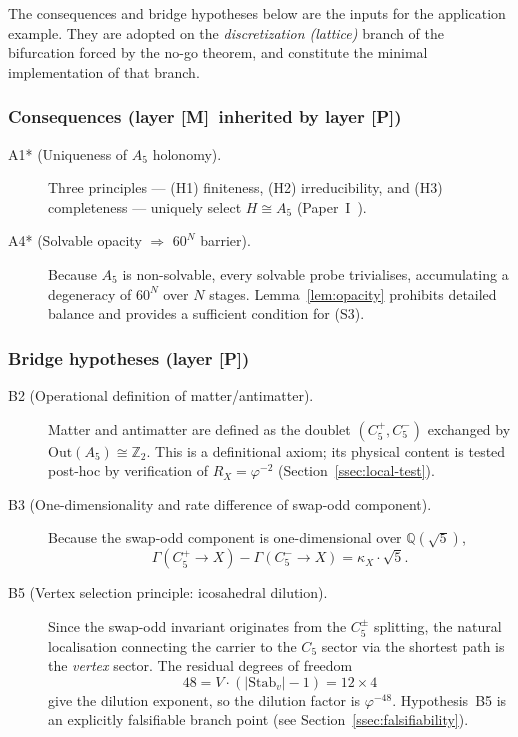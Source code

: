 \documentclass[sn-mathphys-num,Numbered]{sn-jnl}
\theoremstyle{thmstyleone}
\theoremstyle{thmstylethree}
\theoremstyle{thmstyletwo}
\newcommand{\Qsqrt}{\mathbb{Q}(\sqrt{5})}
\newcommand{\tagM}{[\textbf{M}]}
\newcommand{\tagP}{[\textbf{P}]}
\begin{document}
The consequences and bridge hypotheses below are the inputs for the
application example.  They are adopted on the \emph{discretization
(lattice)} branch of the bifurcation forced by the no-go theorem, and
constitute the minimal implementation of that branch.

\subsubsection{Consequences (layer \tagM\ inherited by layer \tagP)}

\begin{description}
  \item[A1* (Uniqueness of $A_5$ holonomy).]
    Three principles --- (H1) finiteness, (H2) irreducibility, and
    (H3) completeness --- uniquely select $H \cong A_5$
    (Paper~I~\cite{PaperI}).

  \item[A4* (Solvable opacity $\Rightarrow$ $60^N$ barrier).]
    Because $A_5$ is non-solvable, every solvable probe trivialises,
    accumulating a degeneracy of $60^N$ over $N$ stages.
    Lemma~\ref{lem:opacity} prohibits detailed balance and provides a
    sufficient condition for (S3).
\end{description}

\subsubsection{Bridge hypotheses (layer \tagP)}

\begin{description}
  \item[B2 (Operational definition of matter/antimatter).]
    Matter and antimatter are defined as the doublet $(C_5^+, C_5^-)$
    exchanged by $\mathrm{Out}(A_5) \cong \mathbb{Z}_2$.  This is a
    definitional axiom; its physical content is tested post-hoc by
    verification of $R_X = \varphi^{-2}$ (Section~\ref{ssec:local-test}).

  \item[B3 (One-dimensionality and rate difference of swap-odd
    component).]
    Because the swap-odd component is one-dimensional over $\Qsqrt$,
    \begin{equation}
      \Gamma(C_5^+ \to X) - \Gamma(C_5^- \to X)
      = \kappa_X \cdot \sqrt{5}.
      \label{eq:B3}
    \end{equation}

  \item[B5 (Vertex selection principle: icosahedral dilution).]
    Since the swap-odd invariant originates from the $C_5^\pm$
    splitting, the natural localisation connecting the carrier to the
    $C_5$ sector via the shortest path is the \emph{vertex} sector.
    The residual degrees of freedom
    \begin{equation}
      48 = V \cdot (|\mathrm{Stab}_v| - 1) = 12 \times 4
      \label{eq:index48}
    \end{equation}
    give the dilution exponent, so the dilution factor is
    $\varphi^{-48}$.  Hypothesis~B5 is an explicitly falsifiable
    branch point (see Section~\ref{ssec:falsifiability}).
\end{description}
\end{document}
